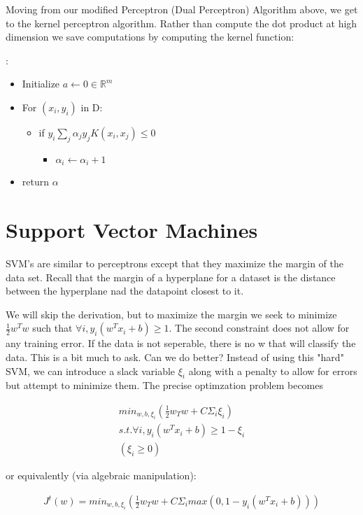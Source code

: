 Moving from our modified Perceptron (Dual Perceptron) Algorithm above, we get to the kernel perceptron algorithm. Rather than compute the dot product at high dimension we save computations by computing the kernel function:

:
\begin{itemize}
    \item Initialize $a \leftarrow 0 \in \mathbb{R}^{m}$
    \item For $(x_i, y_i)$ in D:
    \begin{itemize}
        \item if $y_i \sum_j \alpha_j y_j K(x_i, x_j) \leq 0$
        \begin{itemize}
            \item $\alpha_i \leftarrow \alpha_i + 1$
        \end{itemize}
    \end{itemize}
    \item return $\alpha$
\end{itemize}

\section{Support Vector Machines}
SVM's are similar to perceptrons except that they maximize the margin of the data set. Recall that the margin of a hyperplane for a dataset is the distance between the hyperplane nad the datapoint closest to it.

We will skip the derivation, but to maximize the margin we seek to minimize $\frac{1}{2}w^Tw$ such that $\forall i, y_i(w^Tx_i + b) \ge 1$. The second constraint does not allow for any training error. If the data is not seperable, there is no w that will classify the data. This is a bit much to ask. Can we do better? Instead of using this "hard" SVM, we can introduce a slack variable $\xi_i$ along with a penalty to allow for errors but attempt to minimize them. The precise optimzation problem becomes

\begin{gather*}
    min_{w, b, \xi_i}(\frac{1}{2}w_Tw + C\Sigma_i \xi_i) \\
    s.t. \forall i, y_i(w^Tx_i + b) \ge 1 - \xi_i \\
    (\xi_i \ge 0)
\end{gather*}

or equivalently (via algebraic manipulation)$: $

\begin{gather*}
    J^t(w) = min_{w, b, \xi_i}(\frac{1}{2}w_Tw + C\Sigma_i max(0, 1-y_i(w^Tx_i + b))) 
\end{gather*}

